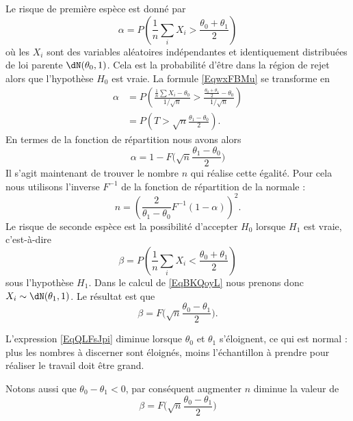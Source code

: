 \begin{example}
	Le risque de première espèce est donné par
	\begin{equation}    \label{EqwxFBMu}
		\alpha=P\left( \frac{1}{ n }\sum_iX_i>\frac{ \theta_0+\theta_1 }{2} \right)
	\end{equation}
	où les \( X_i\) sont des variables aléatoires indépendantes et identiquement distribuées de loi parente \( \dN(\theta_0,1)\). Cela est la probabilité d'être dans la région de rejet alors que l'hypothèse \( H_0\) est vraie. La formule \eqref{EqwxFBMu} se transforme en
	\begin{subequations}
		\begin{align}
			\alpha & =P\left( \frac{ \frac{1}{ n }\sum X_i-\theta_0 }{ 1/\sqrt{n} }>\frac{ \frac{ \theta_0+\theta_1 }{2}-\theta_0 }{ 1/\sqrt{n} } \right) \\
			       & =P(T>\sqrt{n}\frac{ \theta_1-\theta_0 }{2}).
		\end{align}
	\end{subequations}
	En termes de la fonction de répartition nous avons alors
	\begin{equation}
		\alpha=1-F\big( \sqrt{n}\frac{ \theta_1-\theta_0 }{2} \big)
	\end{equation}
	Il s'agit maintenant de trouver le nombre \( n\) qui réalise cette égalité. Pour cela nous utilisons l'inverse \( F^{-1}\) de la fonction de répartition de la normale :
	\begin{equation}    \label{EqQLFsJpi}
		n=\left( \frac{ 2 }{ \theta_1-\theta_0 }F^{-1}(1-\alpha) \right)^2.
	\end{equation}
	Le risque de seconde espèce est la possibilité d'accepter \( H_0\) lorsque \( H_1\) est vraie, c'est-à-dire
	\begin{equation}        \label{EqBKQoyL}
		\beta=P\left( \frac{1}{ n }\sum_i X_i<\frac{ \theta_0+\theta_1 }{2} \right)
	\end{equation}
	sous l'hypothèse \( H_1\). Dans le calcul de \eqref{EqBKQoyL} nous prenons donc \( X_i\sim\dN(\theta_1,1)\). Le résultat est que
	\begin{equation}
		\beta=F\big( \sqrt{n}\frac{ \theta_0-\theta_1 }{2} \big).
	\end{equation}

	\begin{remark}
		L'expression \eqref{EqQLFsJpi} diminue lorsque \( \theta_0\) et \( \theta_1\) s'éloignent, ce qui est normal : plus les nombres à discerner sont éloignés, moins l'échantillon à prendre pour réaliser le travail doit être grand.

		Notons aussi que \( \theta_0-\theta_1<0\), par conséquent augmenter \( n\) diminue la valeur de
		\begin{equation}
			\beta=F\big( \sqrt{n}\frac{ \theta_0-\theta_1 }{2} \big)
		\end{equation}
	\end{remark}
\end{example}


